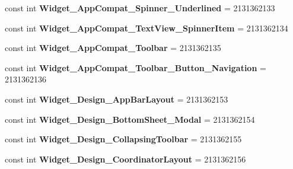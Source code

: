 \begin{DoxyCompactItemize}
const int {\bfseries Widget\+\_\+\+App\+Compat\+\_\+\+Spinner\+\_\+\+Underlined} = 2131362133
\item 
\mbox{\label{class_sample_app_1_1_droid_1_1_resource_1_1_style_a4744a3cf176c20a6ec66841fccc9d099}} 
const int {\bfseries Widget\+\_\+\+App\+Compat\+\_\+\+Text\+View\+\_\+\+Spinner\+Item} = 2131362134
\item 
\mbox{\label{class_sample_app_1_1_droid_1_1_resource_1_1_style_a33b1bf877381fca3e681100c5ae5c387}} 
const int {\bfseries Widget\+\_\+\+App\+Compat\+\_\+\+Toolbar} = 2131362135
\item 
\mbox{\label{class_sample_app_1_1_droid_1_1_resource_1_1_style_a3325068a9786ce859685443888ca7248}} 
const int {\bfseries Widget\+\_\+\+App\+Compat\+\_\+\+Toolbar\+\_\+\+Button\+\_\+\+Navigation} = 2131362136
\item 
\mbox{\label{class_sample_app_1_1_droid_1_1_resource_1_1_style_aa0d0d28bf3c5d10bdabe4cc898493bd8}} 
const int {\bfseries Widget\+\_\+\+Design\+\_\+\+App\+Bar\+Layout} = 2131362153
\item 
\mbox{\label{class_sample_app_1_1_droid_1_1_resource_1_1_style_a3a4a0f4b5ccb6215cc1be912373a781f}} 
const int {\bfseries Widget\+\_\+\+Design\+\_\+\+Bottom\+Sheet\+\_\+\+Modal} = 2131362154
\item 
\mbox{\label{class_sample_app_1_1_droid_1_1_resource_1_1_style_a2e394c3ab75ef842967aea8daaee4408}} 
const int {\bfseries Widget\+\_\+\+Design\+\_\+\+Collapsing\+Toolbar} = 2131362155
\item 
\mbox{\label{class_sample_app_1_1_droid_1_1_resource_1_1_style_aa803299fafccdaa50c9cf43ba9f9069a}} 
const int {\bfseries Widget\+\_\+\+Design\+\_\+\+Coordinator\+Layout} = 2131362156
\item 
\mbox{\label{class_sample_app_1_1_droid_1_1_resource_1_1_style_a1571899478087f4927fc41c686c8d2b7}} 

\end{DoxyCompactItemize}
